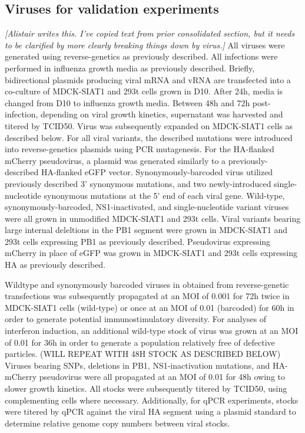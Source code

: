 \documentclass[9pt,lineno]{elife}
\newcommand{\jdbcomment}[1]{\emph{\color{red} [#1]}}
\begin{document}
\subsection{Viruses for validation experiments}
\jdbcomment{Alistair writes this. I've copied text from prior consolidated section, but it needs to be clarified by more clearly breaking things down by virus.}
All viruses were generated using reverse-genetics as previously described.
All infections were performed in influenza growth media as previously described.
Briefly, bidirectional plasmids producing viral mRNA and vRNA are transfected into a co-culture of MDCK-SIAT1 and 293t cells grown in D10.
After 24h, media is changed from D10 to influenza growth media.
Between 48h and 72h post-infection, depending on viral growth kinetics, supernatant was harvested and titered by TCID50.
Virus was subsequently expanded on MDCK-SIAT1 cells as described below.
For all viral variants, the described mutations were introduced into reverse-genetics plasmids using PCR mutagenesis. 
For the HA-flanked mCherry pseudovirus, a plasmid was generated similarly to a previously-described HA-flanked eGFP vector.
Synonymously-barcoded virus utilized previously described 3' synonymous mutations, and two newly-introduced single-nucleotide synonymous mutations at the 5' end of each viral gene.
Wild-type, synonymously-barcoded, NS1-inactivated, and single-nucleotide variant viruses were all grown in unmodified MDCK-SIAT1 and 293t cells.
Viral variants bearing large internal deleltions in the PB1 segment were grown in MDCK-SIAT1 and 293t cells expressing PB1 as previously described.
Pseudovirus expressing mCherry in place of eGFP was grown in MDCK-SIAT1 and 293t cells expressing HA as previously described.

Wildtype and synonymously barcoded viruses in  obtained from reverse-genetic transfections was subsequently propagated at an MOI of 0.001 for 72h twice in MDCK-SIAT1 cells (wild-type) or once at an MOI of 0.01 (barcoded) for 60h in order to generate potential immunostimulatory diversity.
For analyses of interferon induction, an additional wild-type stock of virus was grown at an MOI of 0.01 for 36h in order to generate a population relatively free of defective particles. (WILL REPEAT WITH 48H STOCK AS DESCRIBED BELOW)
Viruses bearing SNPs, deletions in PB1, NS1-inactivation mutations, and HA-mCherry pseudovirus were all propagated at an MOI of 0.01 for 48h owing to slower growth kinetics. 
All stocks were subsequently titered by TCID50, using complementing cells where necessary.
Additionally, for qPCR experiments, stocks were titered by qPCR against the viral HA segment using a plasmid standard to determine relative genome copy numbers between viral stocks.
\end{document}
